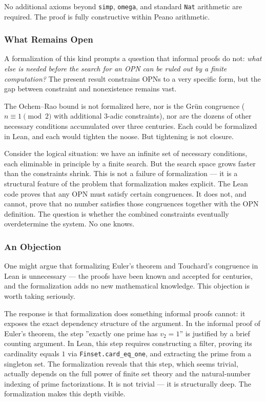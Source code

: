\documentclass[11pt,a4paper]{article}
\begin{document}
No additional axioms beyond \texttt{simp}, \texttt{omega}, and standard \texttt{Nat} arithmetic are required. The proof is fully constructive within Peano arithmetic.

\subsubsection{What Remains Open}

A formalization of this kind prompts a question that informal proofs do not: \emph{what else is needed before the search for an OPN can be ruled out by a finite computation?} The present result constrains OPNs to a very specific form, but the gap between constraint and nonexistence remains vast.

The Ochem--Rao bound is not formalized here, nor is the Grün congruence ($n \equiv 1 \pmod{2}$ with additional $3$-adic constraints), nor are the dozens of other necessary conditions accumulated over three centuries. Each could be formalized in Lean, and each would tighten the noose. But tightening is not closure.

Consider the logical situation: we have an infinite set of necessary conditions, each eliminable in principle by a finite search. But the search space grows faster than the constraints shrink. This is not a failure of formalization --- it is a structural feature of the problem that formalization makes explicit. The Lean code proves that any OPN must satisfy certain congruences. It does not, and cannot, prove that no number satisfies those congruences together with the OPN definition. The question is whether the combined constraints eventually overdetermine the system. No one knows.

\subsubsection{An Objection}

One might argue that formalizing Euler's theorem and Touchard's congruence in Lean is unnecessary --- the proofs have been known and accepted for centuries, and the formalization adds no new mathematical knowledge. This objection is worth taking seriously.

The response is that formalization does something informal proofs cannot: it exposes the exact dependency structure of the argument. In the informal proof of Euler's theorem, the step ''exactly one prime has $v_2 = 1$'' is justified by a brief counting argument. In Lean, this step requires constructing a filter, proving its cardinality equals $1$ via \texttt{Finset.card\_eq\_one}, and extracting the prime from a singleton set. The formalization reveals that this step, which seems trivial, actually depends on the full power of finite set theory and the natural-number indexing of prime factorizations. It is not trivial --- it is structurally deep. The formalization makes this depth visible.
\end{document}
